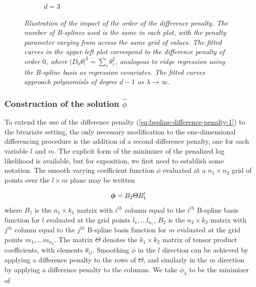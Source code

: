 \begin{figure}[H]
\begin{subfigure}{.5\textwidth}
\caption{$d=3$}
\end{subfigure}
\caption{\textit{Illustration of the impact of the order of the difference penalty. The number of B-splines used is the same in each plot, with the penalty parameter varying from across the same grid of values. The fitted curves in the upper left plot correspond to the difference penalty of order $0$, where $\vert D_0 \theta \vert^2 = \sum_{i} \theta_i^2$, analogous to ridge regression using the B-spline basis as regression covariates. The fitted curves approach polynomials of degree $d-1$ as $\lambda \rightarrow \infty$.}}
\label{fig:PS-difference-order-demo}
\end{figure}





\subsubsection{Construction of the solution $\hat{\phi}$}

To extend the use of the difference penalty (\ref{eq:bspline-difference-penalty-1}) to the bivariate setting, the only necessary modification to the one-dimensional differencing procedure is the addition of a second difference penalty, one for each variable $l$ and $m$. The explicit form of the minimizer of the penalized log likelihood is available, but for exposition, we first need to establish some notation. The smooth varying coefficient function $\phi$ evaluated at a $n_1 \times n_2$ grid of points over the $l \times m$ plane may be written 

\begin{equation*} 
\mbox{\boldmath $\phi$} = B_2 \Theta B'_1
\end{equation*}
\noindent 
where $B_1$ is the $n_1 \times k_1$ matrix with $i^{th}$ column equal to the $i^{th}$ B-spline basis function for $l$ evaluated at the grid points $l_1,\dots l_{n_1}$,  $B_2$ is the $n_2 \times k_2$ matrix with $j^{th}$ column equal to the $j^{th}$ B-spline basis function for $m$ evaluated at the grid points $m_1,\dots m_{n_2}$. The matrix $\Theta$ denotes the $k_1 \times k_2$ matrix of tensor product coefficients, with elements $\theta_{ij}$. Smoothing $\phi$ in the $l$ direction can be achieved by applying a difference penalty to the rows of $\Theta$, and similarly in the $m$ direction by applying a difference penalty to the columns. We take $\phi_\lambda$ to be the minimizer of 

